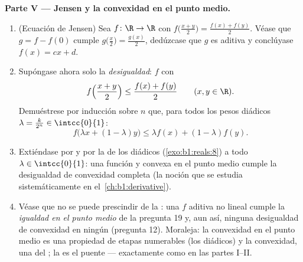 \begin{problem}[{Problema del fin de semana --- $f(x + y) = f(x) + f(y)$:
la regularidad fuerza la linealidad, y el retrato de los monstruos}]
\medskip
\noindent\textbf{Parte V --- Jensen y la convexidad en el punto medio.}
\begin{enumerate}[resume]
  \item (Ecuación de Jensen) Sea $f \colon \R \to \R$  con
        $f\bigl(\frac{x+y}{2}\bigr) = \frac{f(x) + f(y)}{2}$. Véase
        que $g = f - f(0)$ cumple
        $g\bigl(\frac x2\bigr) = \frac{g(x)}{2}$, dedúzcase que $g$ es
        aditiva y conclúyase $f(x) = cx + d$.
  \item Supóngase ahora solo la \emph{desigualdad}: $f$ 
        con
        \[
        f\Bigl(\frac{x + y}{2}\Bigr) \leq \frac{f(x) +
        f(y)}{2} \qquad (x, y \in \R).
        \]
        Demuéstrese por inducción sobre $n$ que, para todos los pesos
        diádicos $\lambda = \frac{k}{2^n} \in \intcc{0}{1}$:
        \[
        f\bigl(\lambda x + (1 - \lambda)y\bigr) \leq \lambda
        f(x) + (1 - \lambda) f(y) .
        \]
  \item Extiéndase por  y por la  de los
        diádicos (\cref{exo:b1:reals:8}) a todo
        $\lambda \in \intcc{0}{1}$: una función  y convexa en
        el punto medio cumple la desigualdad de convexidad completa
        (la noción que se estudia sistemáticamente en
        el~\cref{ch:b1:derivative}).
  \item Véase que no se puede prescindir de la : una
        $f$ aditiva no lineal cumple la \emph{igualdad en el punto
        medio} de la pregunta 19 y, aun así, ninguna desigualdad de
        convexidad en ningún  (pregunta 12). Moraleja: la
        convexidad en el punto medio es una propiedad de etapas
        numerables (los diádicos) y la convexidad, una del ;
        la  es el puente --- exactamente como en las
        partes I--II.
\end{enumerate}


\end{problem}

